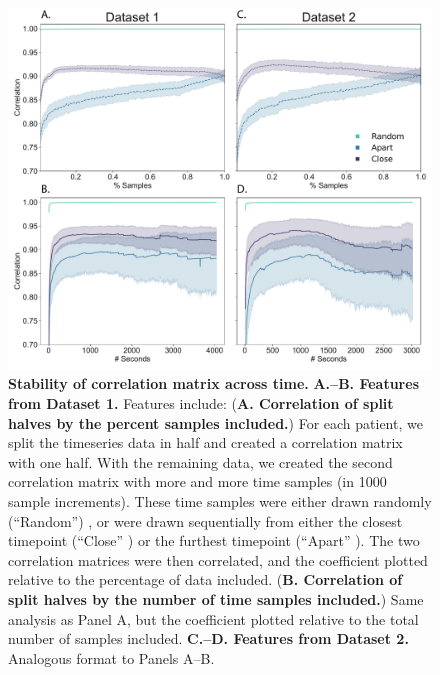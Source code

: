 \documentclass[10pt]{article}
\begin{document}
\begin{figure}[p]
\centering
\includegraphics[width=\textwidth]{figs/supplemental_7}
\caption{\textbf{Stability of correlation matrix across time.} \textbf{A.--B.  Features from
    Dataset 1.}  Features include: (\textbf{A. Correlation of split
  halves by the percent samples included.})  For each patient, we
  split the timeseries data in
  half and created a correlation matrix with one half.  With the
  remaining data, we created the second correlation matrix with more
  and more time samples (in 1000 sample increments).  These time
  samples were either drawn randomly (``Random'') , or were drawn sequentially from
  either the closest timepoint (``Close'' ) or the furthest timepoint
  (``Apart'' ). The two correlation matrices were then correlated, and the
  coefficient plotted relative to the percentage of data included.  (\textbf{B. Correlation of split
  halves by the number of time samples included.})
Same analysis as Panel A, but the
  coefficient plotted relative to the total number of samples included.
  \textbf{C.--D. Features from Dataset 2.}  Analogous format to Panels
  A--B.}
\label{fig:supplemental_7}
\end{figure}
\end{document}
